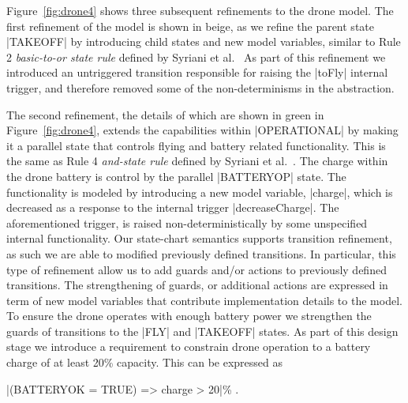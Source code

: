 Figure~\ref{fig:drone4} shows three subsequent refinements to the drone model. The first refinement of the model is shown in beige, as we refine the parent state |TAKEOFF|
by introducing child states and new model variables, similar to 
Rule 2 \emph{basic-to-or state rule} defined by Syriani et al.~\cite{Syriani_2019}
As part of this refinement we introduced an untriggered transition responsible for 
raising the |toFly| internal trigger, and therefore removed some of the non-determinisms in the abstraction.

The second refinement, the details of which are shown in green in Figure~\ref{fig:drone4}, 
extends the capabilities within |OPERATIONAL| by making it a parallel
state that controls flying and battery related functionality. 
This is the same as Rule 4 \emph{and-state rule} defined by Syriani et al.~\cite{Syriani_2019}.
The charge within the drone battery is control by the parallel |BATTERYOP| state. 
The functionality is modeled by introducing a new model variable, |charge|, which is decreased as 
a response to the internal trigger |decreaseCharge|. The aforementioned trigger, is raised non-deterministically by some 
unspecified internal functionality. Our state-chart semantics supports transition refinement, as such
we are able to modified previously defined transitions. In particular, this type of refinement allow
us to add guards and/or actions to previously defined transitions. The strengthening of guards, or additional 
actions are expressed in term of new model variables that contribute implementation details to the model.
To ensure the drone operates with enough battery power we strengthen the guards of transitions 
to the |FLY| and |TAKEOFF| states.
As part of this design stage we introduce a requirement to constrain drone operation 
to a battery charge of at least 20\% capacity. This can be expressed as
\begin{center}
  |(BATTERYOK = TRUE) => charge > 20|\% .
\end{center}

